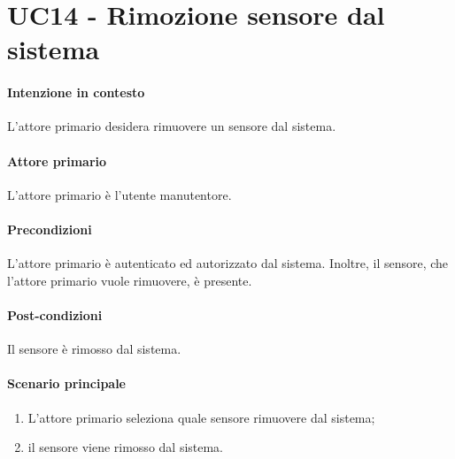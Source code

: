 \section{UC14 - Rimozione sensore dal sistema}\label{uc:14}


\paragraph{Intenzione in contesto} L'attore primario desidera rimuovere un sensore dal sistema.
\paragraph{Attore primario}L'attore primario è l'utente manutentore.

\paragraph{Precondizioni} L'attore primario è autenticato ed autorizzato dal sistema. Inoltre, il sensore, che l'attore primario vuole rimuovere, è presente.

\paragraph{Post-condizioni} Il sensore è rimosso dal sistema.
\paragraph{Scenario principale}
\begin{enumerate}
    \item L'attore primario seleziona quale sensore rimuovere dal sistema;
    \item il sensore viene rimosso dal sistema.
\end{enumerate}